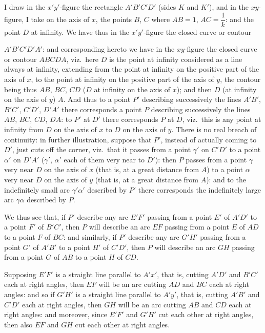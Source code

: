 \documentclass[11pt,a4paper]{article}
\begin{document}
\smallskip
I draw in the $x'y'$-figure the rectangle $A'B'C'D'$ (sides $K$ and $K'$), and in the $xy$-figure, I take on the axis of $x$, the points $B$, $C$ where $AB = 1$, $AC = \dfrac{1}{k}$: and the point $D$ at infinity. We have thus in the $x'y'$-figure the closed curve or contour

\newpage

$A'B'C'D'A'$: and corresponding hereto we have in the $xy$-figure the closed curve or contour $ABCDA$, viz.\ here $D$ is the point at infinity considered as a line always at infinity, extending from the point at infinity on the positive part of the axis of $x$, to the point at infinity on the positive part of the axis of $y$, the contour being thus $AB$, $BC$, $CD$ ($D$ at infinity on the axis of $x$); and then $D$ (at infinity on the axis of $y$) $A$. And thus to a point $P'$ describing successively the lines $A'B'$, $B'C'$, $C'D'$, $D'A'$ there corresponds a point $P$ describing successively the lines $AB$, $BC$, $CD$, $DA$: to $P'$ at $D'$ there corresponds $P$ at $D$, viz.\ this is any point at infinity from $D$ on the axis of $x$ to $D$ on the axis of $y$. There is no real breach of continuity: in further illustration, suppose that $P'$, instead of actually coming to $D'$, just cuts off the corner, viz.\ that it passes from a point $\gamma'$ on $C'D'$ to a point $\alpha'$ on $D'A'$ ($\gamma'$, $\alpha'$ each of them very near to $D'$): then $P$ passes from a point $\gamma$ very near $D$ on the axis of $x$ (that is, at a great distance from $A$) to a point $\alpha$ very near $D$ on the axis of $y$ (that is, at a great distance from $A$): and to the indefinitely small arc $\gamma'\alpha'$ described by $P'$ there corresponds the indefinitely large arc $\gamma\alpha$ described by $P$.

\smallskip
We thus see that, if $P'$ describe any arc $E'F'$ passing from a point $E'$ of $A'D'$ to a point $F'$ of $B'C'$, then $P$ will describe an arc $EF$ passing from a point $E$ of $AD$ to a point $F$ of $BC$: and similarly, if $P'$ describe any arc $G'H'$ passing from a point $G'$ of $A'B'$ to a point $H'$ of $C'D'$, then $P$ will describe an arc $GH$ passing from a point $G$ of $AB$ to a point $H$ of $CD$.

\smallskip
Supposing $E'F'$ is a straight line parallel to $A'x'$, that is, cutting $A'D'$ and $B'C'$ each at right angles, then $EF$ will be an arc cutting $AD$ and $BC$ each at right angles: and so if $G'H'$ is a straight line parallel to $A'y'$, that is, cutting $A'B'$ and $C'D'$ each at right angles, then $GH$ will be an arc cutting $AB$ and $CD$ each at right angles: and moreover, since $E'F'$ and $G'H'$ cut each other at right angles, then also $EF$ and $GH$ cut each other at right angles.
\end{document}
